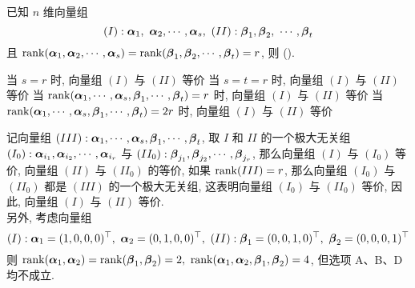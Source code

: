 \begin{example}
    已知 $n$ 维向量组 $$(I):\vb*{\alpha}_1,~\vb*{\alpha}_2,\cdots,\vb*{\alpha}_s,~(II): \vb*{\beta}_1,\vb*{\beta}_2,~\cdots,\vb*{\beta}_t$$
    且 $\rank(\vb*{\alpha}_1,\vb*{\alpha}_2,\cdots,\vb*{\alpha}_s)=\rank(\vb*{\beta}_1,\vb*{\beta}_2,\cdots,\vb*{\beta}_t)=r$, 则 (\quad).
    \begin{tasks}
        \task 当 $s=r$ 时, 向量组 $(I)$ 与 $(II)$ 等价
        \task 当 $s=t=r$ 时, 向量组 $(I)$ 与 $(II)$ 等价
        \task 当 $\rank(\vb*{\alpha}_1,\cdots,\vb*{\alpha}_s,\vb*{\beta}_1,\cdots,\vb*{\beta}_t)=r$ 时, 向量组 $(I)$ 与 $(II)$ 等价
        \task 当 $\rank(\vb*{\alpha}_1,\cdots,\vb*{\alpha}_s,\vb*{\beta}_1,\cdots,\vb*{\beta}_t)=2r$ 时, 向量组 $(I)$ 与 $(II)$ 等价
    \end{tasks}
\end{example}
\begin{solution}
    记向量组 $(III):\vb*{\alpha}_1,\cdots,\vb*{\alpha}_s,\vb*{\beta}_1,\cdots,\vb*{\beta}_t$, 取 ${I}$ 和 ${II}$ 的一个极大无关组 $(I_0): \vb*{\alpha}_{i_1},\vb*{\alpha}_{i_2},\cdots,\vb*{\alpha}_{i_r}$ 与 $(II_0):\vb*{\beta}_{j_1},\vb*{\beta}_{j_2},\cdots,\vb*{\beta}_{j_r}$,
    那么向量组 $(I)$ 与 $(I_0)$ 等价, 向量组 $(II)$ 与 $(II_0)$ 的等价, 如果 $\rank(III)=r$, 那么向量组 $(I_0)$ 与 $(II_0)$ 都是 $(III)$ 的一个极大无关组, 这表明向量组 $(I_0)$ 与 $(II_0)$ 等价, 因此, 向量组 $(I)$ 与 $(II)$ 等价.\\
    另外, 考虑向量组 $$(I):\vb*{\alpha}_1=(1,0,0,0)^\top,~\vb*{\alpha}_2=(0,1,0,0)^\top,~(II):\vb*{\beta}_1=(0,0,1,0)^\top,~\vb*{\beta}_2=(0,0,0,1)^\top$$
    则 $\rank(\vb*{\alpha}_1,\vb*{\alpha}_2)=\rank(\vb*{\beta}_1,\vb*{\beta}_2)=2,~\rank(\vb*{\alpha}_1,\vb*{\alpha}_2,\vb*{\beta}_1,\vb*{\beta}_2)=4$, 但选项 A、B、D 均不成立.
\end{solution}

